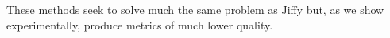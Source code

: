 
These methods seek to solve much the same problem as Jiffy but, as we show experimentally, produce metrics of much lower quality. %




